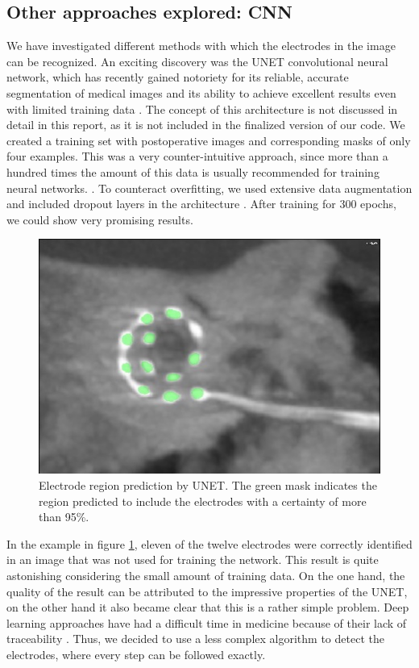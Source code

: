 \documentclass[a4paper, 10pt, twocolumn]{article}
\begin{document}
\subsection{Other approaches explored: CNN}
We have investigated different methods with which the electrodes in the image can be recognized. An exciting discovery was the UNET convolutional neural network, which has recently gained notoriety for its reliable, accurate segmentation of medical images and its ability to achieve excellent results even with limited training data \cite{ronneberger_u-net_2015}. The concept of this architecture is not discussed in detail in this report, as it is not included in the finalized version of our code. We created a training set with postoperative images and corresponding masks of only four examples. This was a very counter-intuitive approach, since more than a hundred times the amount of this data is usually recommended for training neural networks. \cite{hestness_deep_2017,foody_effect_1995}. To counteract overfitting, we used extensive data augmentation and included dropout layers in the architecture \cite{wu_towards_2015}. After training for 300 epochs, we could show very promising results.
\begin{figure}[ht]
	\centering
  \includegraphics[width=.5\textwidth]{UNET.jpg}
	\caption{Electrode region prediction by UNET. The green mask indicates the region predicted to include the electrodes with a certainty of more than 95\%.}
	\label{UNET}
\end{figure}
In the example in figure \ref{UNET}, eleven of the twelve electrodes were correctly identified in an image that was not used for training the network. This result is quite astonishing considering the small amount of training data. On the one hand, the quality of the result can be attributed to the impressive properties of the UNET, on the other hand it also became clear that this is a rather simple problem. Deep learning approaches have had a difficult time in medicine because of their lack of traceability \cite{litjens_survey_2017}. Thus, we decided to use a less complex algorithm to detect the electrodes, where every step can be followed exactly.
\end{document}
